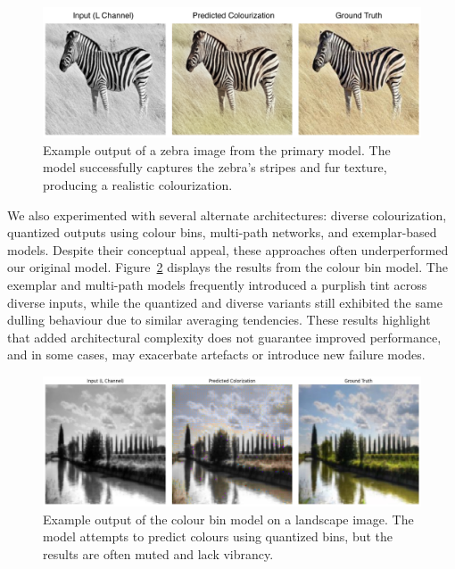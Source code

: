 \documentclass{article} %
\begin{document}
\begin{figure}[htbp]            %
  \centering
  \includegraphics[width=0.9\linewidth]{Figs/final-model-example.png}
  \caption{Example output of a zebra image from the primary model. The model successfully captures the zebra's stripes and fur texture, producing a realistic colourization.}
  \label{fig:final-model-zebra}
\end{figure}

We also experimented with several alternate architectures: diverse colourization, quantized outputs using colour bins, multi-path networks, and exemplar-based models. Despite their 
conceptual appeal, these approaches often underperformed our original model. Figure~\ref{fig:colour-bins-landscape} displays the results from the colour bin model. The exemplar and multi-path models 
frequently introduced a purplish tint across diverse inputs, while the quantized and diverse variants still exhibited the same dulling behaviour due to similar averaging tendencies. 
These results highlight that added architectural complexity does not guarantee improved performance, and in some cases, may exacerbate artefacts or introduce new failure modes.

\begin{figure}[htbp]            %
  \centering
  \includegraphics[width=0.9\linewidth]{Figs/colour-bins-landscape.jpg}
  \caption{Example output of the colour bin model on a landscape image. The model attempts to predict colours using quantized bins, but the results are often muted and lack vibrancy.}
  \label{fig:colour-bins-landscape}
\end{figure}
\end{document}
